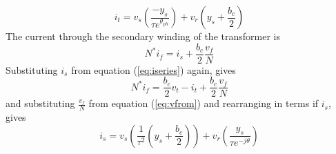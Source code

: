 \begin{equation}
\label{eq:ito}
i_t = v_s \left( \frac{-y_s}{\tau e^{\theta_{ph}}} \right) +
v_r \left( y_s + \frac{b_c}{2} \right)
\end{equation}
The current through the secondary winding of the transformer is
\begin{equation}
N^*i_f = i_s + \frac{b_c}{2}\frac{v_{f}}{N}
\end{equation}
Substituting $i_s$ from equation (\ref{eq:iseries}) again, gives
\begin{equation}
N^*i_f = \frac{b_c}{2}v_t - i_t + \frac{b_c}{2}\frac{v_{f}}{N}
\end{equation}
and substituting $\frac{v_{f}}{N}$ from equation (\ref{eq:vfrom}) and
rearranging in terms if $i_s$, gives
\begin{equation}
\label{eq:ifrom}
i_s = v_s \left( \frac{1}{\tau^2} \left(y_s + \frac{b_c}{2}\right) \right) +
v_r \left(\frac{y_s}{\tau e^{-j\theta}}\right)
\end{equation}


